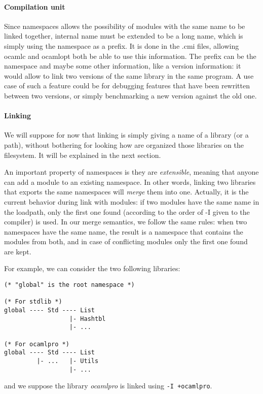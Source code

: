 \documentclass[11pt,a4paper]{article}
\begin{document}
\paragraph{Compilation unit}

Since namespaces allows the possibility of modules with the same name to be
linked together, internal name must be extended to be a long name, which is simply
using the namespace as a prefix. It is done in the .cmi files, allowing ocamlc
and ocamlopt both be able to use this information. The prefix can be the
namespace and maybe some other information, like a version information: it would
allow to link two versions of the same library in the same program. A use case
of such a feature could be for debugging features that have been rewritten
between two versions, or simply benchmarking a new version against the old one.


\paragraph{Linking} We will suppose for now that linking is simply giving a name
of a library (or a path), without bothering for looking how are organized those
libraries on the filesystem. It will be explained in the next section.

An important property of namespaces is they are \emph{extensible}, meaning that
anyone can add a module to an existing namespace. In other words, linking two
libraries that exports the same namespaces will \emph{merge} them into
one. Actually, it is the current behavior during link with modules: if two
modules have the same name in the loadpath, only the first one found (according
to the order of -I given to the compiler) is used. In our merge semantics, we
follow the same rules: when two namespaces have the same name, the result is a
namespace that contains the modules from both, and in case of conflicting
modules only the first one found are kept.

For example, we can consider the two following libraries:

\begin{verbatim}
(* "global" is the root namespace *)

(* For stdlib *)
global ---- Std ---- List
                  |- Hashtbl
                  |- ...

(* For ocamlpro *)
global ---- Std ---- List
         |- ...   |- Utils
                  |- ...
\end{verbatim}
and we suppose the library \emph{ocamlpro} is linked using \texttt{-I +ocamlpro}.
\end{document}
